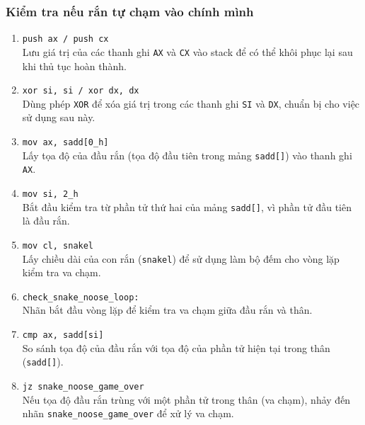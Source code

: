 \documentclass[12pt]{article}
\begin{document}
\subsubsection*{Kiểm tra nếu rắn tự chạm vào chính mình}
\begin{enumerate}[label=\textbf{\arabic*.}]
     \begin{figure}[H]
  \centering
  \texttt{[image: pics/check-snake-noose.png]}
\end{figure}
    \item \texttt{push ax / push cx} \\
    Lưu giá trị của các thanh ghi \texttt{AX} và \texttt{CX} vào stack để có thể khôi phục lại sau khi thủ tục hoàn thành.

    \item \texttt{xor si, si / xor dx, dx} \\
    Dùng phép \texttt{XOR} để xóa giá trị trong các thanh ghi \texttt{SI} và \texttt{DX}, chuẩn bị cho việc sử dụng sau này.

    \item \texttt{mov ax, sadd[0\_h]} \\
    Lấy tọa độ của đầu rắn (tọa độ đầu tiên trong mảng \texttt{sadd[]}) vào thanh ghi \texttt{AX}.

    \item \texttt{mov si, 2\_h} \\
    Bắt đầu kiểm tra từ phần tử thứ hai của mảng \texttt{sadd[]}, vì phần tử đầu tiên là đầu rắn.

    \item \texttt{mov cl, snakel} \\
    Lấy chiều dài của con rắn (\texttt{snakel}) để sử dụng làm bộ đếm cho vòng lặp kiểm tra va chạm.

    \item \texttt{check\_snake\_noose\_loop:} \\
    Nhãn bắt đầu vòng lặp để kiểm tra va chạm giữa đầu rắn và thân.

    \item \texttt{cmp ax, sadd[si]} \\
    So sánh tọa độ của đầu rắn với tọa độ của phần tử hiện tại trong thân (\texttt{sadd[]}).

    \item \texttt{jz snake\_noose\_game\_over} \\
    Nếu tọa độ đầu rắn trùng với một phần tử trong thân (va chạm), nhảy đến nhãn \texttt{snake\_noose\_game\_over} để xử lý va chạm.


\end{enumerate}
\end{document}
